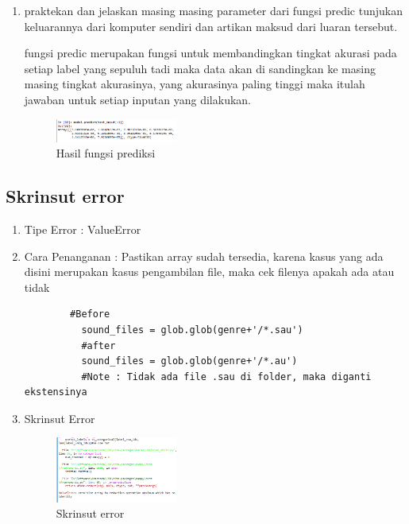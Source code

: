 \begin{enumerate}
\begin{figure}[H]
          \end{figure}
    
    \item praktekan dan jelaskan masing masing parameter dari fungsi predic  tunjukan keluarannya dari komputer sendiri dan artikan maksud dari luaran tersebut. \par 
    \subitem fungsi predic merupakan fungsi untuk membandingkan tingkat akurasi pada setiap label yang sepuluh tadi maka data akan di sandingkan ke masing masing tingkat akurasinya, yang akurasinya paling tinggi maka itulah jawaban untuk setiap inputan yang dilakukan. 
    
    
    
    \begin{figure}[H]
          \centering
          \includegraphics[width=4cm]
          {figures/1174035/chapter6/praktek_9.png}
          \caption{Hasil fungsi prediksi}
          
          \end{figure}
    
    \end{enumerate}

\subsection{Skrinsut error}
\begin{enumerate}
    \item Tipe Error : ValueError
    \item Cara Penanganan : Pastikan array sudah tersedia, karena kasus yang ada disini merupakan kasus pengambilan file, maka cek filenya apakah ada atau tidak
    \begin{verbatim}
        #Before
          sound_files = glob.glob(genre+'/*.sau')
          #after
          sound_files = glob.glob(genre+'/*.au')
          #Note : Tidak ada file .sau di folder, maka diganti ekstensinya
    \end{verbatim}
    \item Skrinsut Error
    \begin{figure}[H]
        \centering
        \includegraphics[width=4cm]
        {figures/1174035/chapter6/error.png}
        \caption{Skrinsut error}
        
        \end{figure}
\end{enumerate}